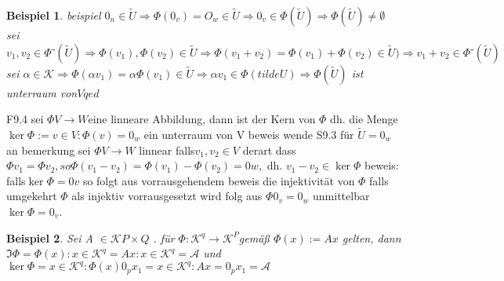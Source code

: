 \documentclass[11pt]{article}
\newtheorem{beispiel}{Beispiel}
\begin{document}
\begin{beispiel}
  beispiel $0_n \in \tilde{U} \Rightarrow \Phi(0_v)= O_w \in \tilde{U} \Rightarrow 0_v \in \Phi(\tilde{U} ) \Rightarrow \Phi(\tilde{U} ) \neq \emptyset$
sei $v_1, v_2 \in \Phi⁻(\tilde{U} ) \Rightarrow \Phi (v_1),\Phi(v_2) \in\tilde{U}  \Rightarrow \Phi (v_1+v_2)= \Phi (v_1)+\Phi(v_2) \in \tilde{U} ) \Rightarrow v_1+v_2 \in \Phi⁻(\tilde{U} ) $
sei $\alpha \in\mathcal{K}\Rightarrow \Phi(\alpha v_1)= \alpha \Phi(v_1) \in \tilde{U} \Rightarrow \alpha v_1 \in \Phi (tilde{U})\Rightarrow \Phi (\tilde{U} )$ ist unterraum von$ V  qed$

\end{beispiel}
F9.4
sei $\Phi V \rightarrow W $eine  linneare Abbildung, dann ist der Kern von $\Phi$ dh. die Menge$ \ker \Phi := {v \in V:\Phi (v) = 0_w}$ ein unterraum von V
beweis wende S9.3 für $\tilde{U}=0_w $an
bemerkung sei $\Phi V \rightarrow W $ linnear falls$ v_1, v_2  \in V$  derart dass 
$\Phi v_1 = \Phi v_2, so \Phi(v_1-v_2)=\Phi(v_1)-\Phi(v_2)= 0w, $ dh.
$ v_1-v_2\in \ker \Phi$
beweis: falls$ \ker \Phi ={0v}$ so folgt aus vorrausgehendem beweis die injektivität von $\Phi$
falls umgekehrt  $\Phi$ als injektiv vorrausgesetzt wird folg aus $\Phi 0_v = 0_w$ unmittelbar$ \ker\Phi={0_v}$.
\begin{beispiel}
 Sei A $\in \mathcal{K}P\times Q$ . für $\Phi: \mathcal{K}^q \rightarrow \mathcal{K}^P $gemäß $\Phi (x):= Ax$ gelten, dann 
$\Im \Phi = {\Phi (x): x \in \mathcal{K}^q}= {Ax:x\in \mathcal{K} ^q}=\mathcal{A}$
und $\ker \Phi = {x \in \mathcal{K} ^q: \Phi (x)0_px_1}={x \in \mathcal{K}^q: Ax= 0_px_1}=\mathcal{A}$
\end{beispiel}
\end{document}
